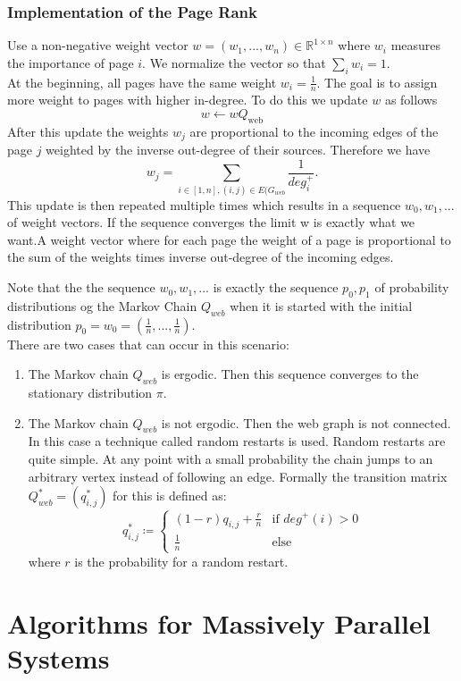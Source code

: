 \documentclass[english]{panikzettel}
\begin{document}
\subsubsection{Implementation of the Page Rank}
Use a non-negative weight vector $w=(w_1,...,w_n)\in\mathbb{R}^{1\times n}$ where $w_i$ measures the importance of page $i$. We normalize the vector so that $\sum_i w_i =1$.\\
At the beginning, all pages have the same weight $w_i=\frac{1}{n}$. The goal is to assign more weight to pages with higher in-degree. To do this we update $w$ as follows
\[
w \leftarrow wQ_{\text{web}}
\]
After this update the weights $w_j$ are proportional to the incoming edges of the page $j$ weighted by the inverse out-degree of their sources. Therefore we have
\[
w_j=\sum_{i\in [1,n], (i,j)\in E(G_{web}}\frac{1}{deg^{+}_i}.
\]
This update is then repeated multiple times which results in a sequence $w_0,w_1,...$ of weight vectors. If the sequence converges the limit w is exactly what we want.A weight vector where for each page the weight of a page is proportional to the sum of the weights times inverse out-degree of the incoming edges.

Note that the the sequence $w_0,w_1,...$ is exactly the sequence $p_0,p_1$ of probability distributions og the Markov Chain $Q_{web}$ when it is started with the initial distribution $p_0=w_0=(\frac{1}{n},...,\frac{1}{n})$.\\
There are two cases that can occur in this scenario:
\begin{enumerate}
\item The Markov chain $Q_{web}$ is ergodic. Then this sequence converges to the stationary distribution $\pi$.
\item The Markov chain $Q_{web}$ is not ergodic. Then the web graph is not connected. In this case a technique called random restarts is used. Random restarts are quite simple. At any point with a small probability the chain jumps to an arbitrary vertex instead of following an edge. Formally the transition matrix $Q_{web}^*=(q_{i,j}^*)$ for this is defined as:
\[
q_{i,j}^*\coloneqq
\begin{cases}
(1-r)q_{i,j}+\frac{r}{n} & \text{if } deg^+(i)>0\\
\frac{1}{n} & \text{else}
\end{cases}
\]
where $r$ is the probability for a random restart.
\end{enumerate}


\section{Algorithms for Massively Parallel Systems}
\end{document}
